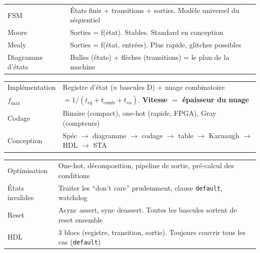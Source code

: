 \documentclass[12pt,a4paper,twoside]{book}
\begin{document}
\begin{bases}[title={\color{white} Résumé --- Les Bases}]
\begin{center}
\renewcommand{\arraystretch}{1.3}
\begin{tabular}{p{3.5cm}p{9.5cm}}
\toprule
FSM & États finis + transitions + sorties. Modèle universel du séquentiel \\
Moore & Sorties = f(état). Stables. Standard en conception \\
Mealy & Sorties = f(état, entrées). Plus rapide, glitches possibles \\
Diagramme d'états & Bulles (états) + flèches (transitions) = le plan de la machine \\
\bottomrule
\end{tabular}
\end{center}
\end{bases}

\begin{approfondissement}[title={\color{white} Résumé --- Approfondissement}]
\begin{center}
\renewcommand{\arraystretch}{1.3}
\begin{tabular}{p{3.5cm}p{9.5cm}}
\toprule
Implémentation & Registre d'état ($n$ bascules D) + nuage combinatoire \\
$f_{\max}$ & $= 1/(t_{cq} + t_{\text{comb}} + t_{su})$. \textbf{Vitesse $=$ épaisseur du nuage} \\
Codage & Binaire (compact), one-hot (rapide, FPGA), Gray (compteurs) \\
Conception & Spéc $\to$ diagramme $\to$ codage $\to$ table $\to$ Karnaugh $\to$ HDL $\to$ STA \\
\bottomrule
\end{tabular}
\end{center}
\end{approfondissement}

\begin{ingenieur}[title={\color{white} Résumé --- Niveau Ingénieur}]
\begin{center}
\renewcommand{\arraystretch}{1.3}
\begin{tabular}{p{3.5cm}p{9.5cm}}
\toprule
Optimisation & One-hot, décomposition, pipeline de sortie, pré-calcul des conditions \\
États invalides & Traiter les ``don't care'' prudemment, clause \texttt{default}, watchdog \\
Reset & Async assert, sync deassert. Toutes les bascules sortent de reset ensemble \\
HDL & 3 blocs (registre, transition, sortie). Toujours couvrir tous les cas (\texttt{default}) \\
\bottomrule
\end{tabular}
\end{center}
\end{ingenieur}
\end{document}
